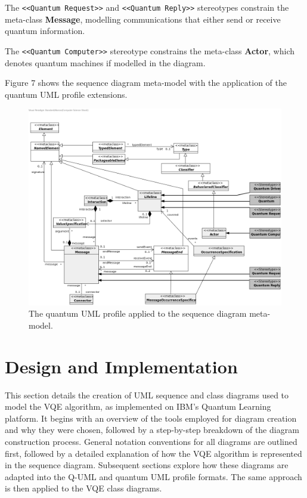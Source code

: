 \documentclass{article}
\begin{document}
The \texttt{<<Quantum Request>>} and \texttt{<<Quantum Reply>>} stereotypes constrain the meta-class \textbf{Message}, modelling communications that either send or receive quantum information\cite{Pérez-Castillo2022}.

The \texttt{<<Quantum Computer>>} stereotype constrains the meta-class \textbf{Actor}, which denotes quantum machines if modelled in the diagram.

Figure 7 shows the sequence diagram meta-model with the application of the quantum UML profile extensions.

\begin{figure}
    \centering
    \includegraphics[width=1\linewidth]{QuantumUMLProfile-SequenceDiagram.png}
    \caption{The quantum UML profile applied to the sequence diagram meta-model\cite{PerezCastillo2021Git}.}
    \label{fig:QUMLPD_SD}
\end{figure}

\section{Design and Implementation}

This section details the creation of UML sequence and class diagrams used to model the VQE algorithm, as implemented on IBM's Quantum Learning platform\cite{IBMVQETut}. It begins with an overview of the tools employed for diagram creation and why they were chosen, followed by a step-by-step breakdown of the diagram construction process. General notation conventions for all diagrams are outlined first, followed by a detailed explanation of how the VQE algorithm is represented in the sequence diagram. Subsequent sections explore how these diagrams are adapted into the Q-UML and quantum UML profile formats. The same approach is then applied to the VQE class diagrams.
\end{document}
